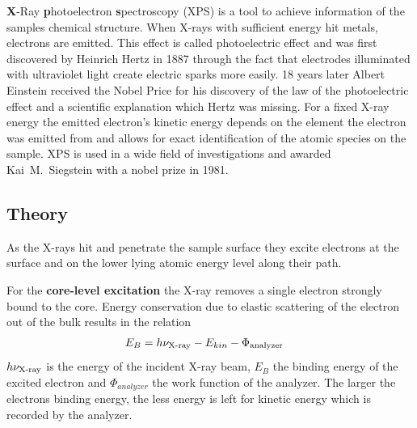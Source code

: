 \label{section:XPS} 
\textbf{X}-Ray \textbf{p}hotoelectron \textbf{s}pectroscopy (XPS) is a tool to achieve information of the samples chemical structure.
When X-rays with sufficient energy hit metals, electrons are emitted. This effect is called photoelectric effect and was first discovered by Heinrich Hertz in 1887 through the fact that electrodes illuminated with ultraviolet light create electric sparks more easily.\cite{hertz_ueber_1887} 18 years later Albert Einstein received the Nobel Price for his discovery of the law of the photoelectric effect\cite{_nobel_prize_1921} and a scientific explanation which Hertz was missing. For a fixed X-ray energy the emitted electron's kinetic energy depends on the element the electron was emitted from and allows for exact identification of the atomic species on the sample. XPS is used in a wide field of investigations\cite{zemlyanov_versatile_2018} and awarded Kai\ M.\ Siegstein with a nobel prize in 1981\cite{_noble_price_1981}.

\subsection{Theory}
As the X-rays hit and penetrate the sample surface they excite electrons at the surface and on the lower lying atomic energy level along their path.

For the \textbf{core-level excitation} the X-ray removes a single electron strongly bound to the core. Energy conservation due to elastic scattering of the electron out of the bulk results in the relation 
\begin{align}
E_B 	&=h\nu_{\textnormal{X-ray}}-E_{kin}-\Phi_{\textnormal{analyzer}}
\end{align}
 $h\nu_{\textnormal{X-ray}}$ is the energy of the incident X-ray beam, $E_B$ the binding energy of the excited electron and $\Phi_{analyzer}$ the work function of the analyzer. The larger the electrons binding energy, the less energy is left for kinetic energy which is recorded by the analyzer.

